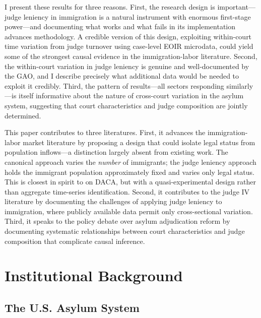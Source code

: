 \documentclass[12pt]{article}
\begin{document}
I present these results for three reasons. First, the research design is important---judge leniency in immigration is a natural instrument with enormous first-stage power---and documenting what works and what fails in its implementation advances methodology. A credible version of this design, exploiting within-court time variation from judge turnover using case-level EOIR microdata, could yield some of the strongest causal evidence in the immigration-labor literature. Second, the within-court variation in judge leniency is genuine and well-documented by the GAO, and I describe precisely what additional data would be needed to exploit it credibly. Third, the pattern of results---all sectors responding similarly---is itself informative about the nature of cross-court variation in the asylum system, suggesting that court characteristics and judge composition are jointly determined.

This paper contributes to three literatures. First, it advances the immigration-labor market literature \citep{borjas2003labor, card2001immigrant, peri2009task, foged2016immigrants, dustmann2017labor} by proposing a design that could isolate legal status from population inflows---a distinction largely absent from existing work. The canonical approach varies the \textit{number} of immigrants; the judge leniency approach holds the immigrant population approximately fixed and varies only legal status. This is closest in spirit to \citet{becker2022legal} on DACA, but with a quasi-experimental design rather than aggregate time-series identification. Second, it contributes to the judge IV literature \citep{kling2006incarceration, dobbie2018effects, maestas2013does, dahl2014peer} by documenting the challenges of applying judge leniency to immigration, where publicly available data permit only cross-sectional variation. Third, it speaks to the policy debate over asylum adjudication reform \citep{gao2008asylum, gao2017asylum} by documenting systematic relationships between court characteristics and judge composition that complicate causal inference.

\section{Institutional Background}

\subsection{The U.S. Asylum System}
\end{document}
